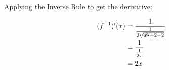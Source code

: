\documentclass[a4paper]{article}
\begin{document}
\begin{enumerate}
\begin{enumerate}
Applying the Inverse Rule to get the derivative:

\begin{align*}
	(f^{-1})'(x) &= \frac{1}{\frac{1}{2\sqrt{x^2 + 2 - 2}}}\notag\\
	&= \frac{1}{\frac{1}{2x}}\notag\\
	&= 2x\notag
\end{align*}
	
\end{enumerate}


\end{enumerate}
\end{document}
